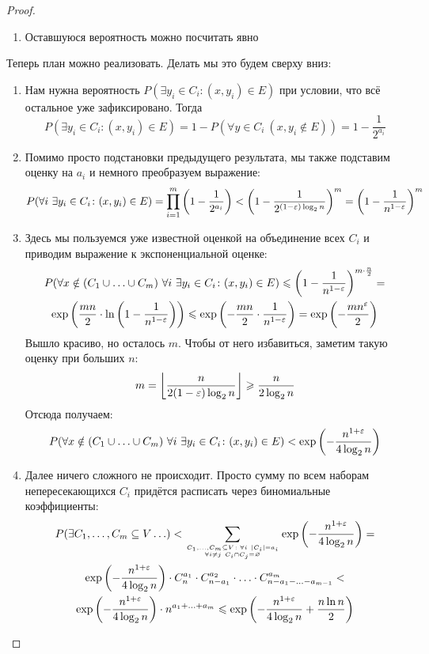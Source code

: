 \begin{proof}
\begin{enumerate}
		\item Оставшуюся вероятность можно посчитать явно
	\end{enumerate}
	
	Теперь план можно реализовать. Делать мы это будем сверху вниз:
	\begin{enumerate}
		\item Нам нужна вероятность $P(\exists y_i \in C_i \colon (x, y_i) \in E)$ при условии, что всё остальное уже зафиксировано. Тогда
		\[
			P(\exists y_i \in C_i \colon (x, y_i) \in E) = 1 - P(\forall y \in C_i\ (x, y_i \notin E)) = 1 - \frac{1}{2^{a_i}}
		\]
		
		\item Помимо просто подстановки предыдущего результата, мы также подставим оценку на $a_i$ и немного преобразуем выражение:
		\[
			P(\forall i\ \exists y_i \in C_i \colon (x, y_i) \in E) = \prod_{i = 1}^m \left(1 - \frac{1}{2^{a_i}}\right) < \left(1 - \frac{1}{2^{(1 - \varepsilon)\log_2 n}}\right)^m = \left(1 - \frac{1}{n^{1 - \varepsilon}}\right)^m
		\]
		
		\item Здесь мы пользуемся уже известной оценкой на объединение всех $C_i$ и приводим выражение к экспоненциальной оценке:
		\begin{multline*}
			P(\forall x \notin (C_1 \cup \ldots \cup C_m)\ \forall i\ \exists y_i \in C_i \colon (x, y_i) \in E) \le \ps{1 - \frac{1}{n^{1 - \eps}}}^{m \cdot \frac{n}{2}} =
			\\
			\exp\ps{\frac{mn}{2} \cdot \ln\ps{1 - \frac{1}{n^{1 - \eps}}}} \le \exp\ps{-\frac{mn}{2} \cdot \frac{1}{n^{1 - \eps}}} = \exp\ps{-\frac{mn^\eps}{2}}
		\end{multline*}
		Вышло красиво, но осталось $m$. Чтобы от него избавиться, заметим такую оценку при больших $n$:
		\[
			m = \left\lfloor \frac{n}{2(1 - \varepsilon)\log_2 n} \right\rfloor \geqslant \frac{n}{2\log_2 n}
		\]
		Отсюда получаем:
		\[
			P(\forall x \notin (C_1 \cup \ldots \cup C_m)\ \forall i\ \exists y_i \in C_i \colon (x, y_i) \in E) < \exp\ps{-\frac{n^{1 + \eps}}{4\log_2 n}}
		\]
		
		\item Далее ничего сложного не происходит. Просто сумму по всем наборам непересекающихся $C_i$ придётся расписать через биномиальные коэффициенты:
		\begin{multline*}
			P(\exists C_1, \ldots, C_m \subseteq V \ldots) < \sum_{C_1, \ldots, C_m \subseteq V \colon \forall i\ |C_i| = a_i \atop {\forall i \neq j\ C_i \cap C_j = \ensuremath{\varnothing}}} \exp\left(-\frac{n^{1 + \varepsilon}}{4\log_2 n}\right) =
			\\
			\exp\left(-\frac{n^{1 + \varepsilon}}{4\log_2 n}\right) \cdot C_n^{a_1} \cdot C_{n - a_1}^{a_2} \cdot \ldots \cdot C_{n - a_1 - \ldots - a_{m - 1}}^{a_m} <
			\\
			\exp\left(-\frac{n^{1 + \varepsilon}}{4\log_2 n}\right) \cdot n^{a_1 + \ldots + a_m} \leqslant \exp\left(-\frac{n^{1 + \varepsilon}}{4\log_2 n} + \frac{n\ln n}{2}\right)
		\end{multline*}
		

\end{enumerate}
\end{proof}
